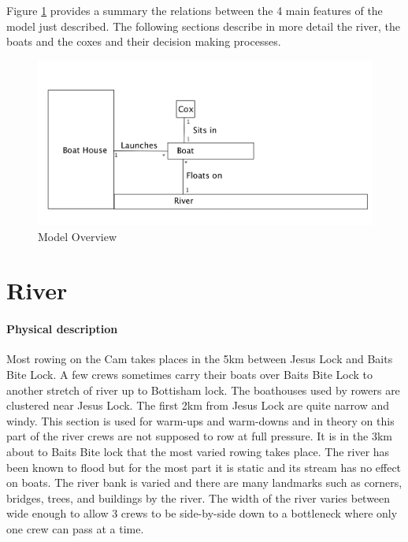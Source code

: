     Figure \ref{fig:modeloverview} provides a summary the relations between the 4 main features of the model just described. The following sections describe in more detail the river, the boats and the coxes and their decision making processes.
    
    \begin{figure}[H]
    \begin{center}
    	\includegraphics[scale=0.3]{images/ModelOverview.png}
    	\caption{Model Overview}
    	\label{fig:modeloverview}
    \end{center}
    \end{figure}

    \section{River}
      \paragraph{Physical description}
      Most rowing on the Cam takes places in the 5km between Jesus Lock and Baits Bite Lock. A few crews sometimes carry their boats over Baits Bite Lock to another stretch of river up to Bottisham lock. The boathouses used by rowers are clustered near Jesus Lock. The first 2km from Jesus Lock are quite narrow and windy. This section is used for warm-ups and warm-downs and in theory on this part of the river crews are not supposed to row at full pressure. It is in the 3km about to Baits Bite lock that the most varied rowing takes place. The river has been known to flood but for the most part it is static and its stream has no effect on boats. The river bank is varied and there are many landmarks such as corners, bridges, trees, and buildings by the river. The width of the river varies between wide enough to allow 3 crews to be side-by-side down to a bottleneck where only one crew can pass at a time.
      
